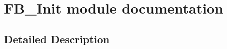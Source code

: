 \hypertarget{group___f_b___init__module}{}\section{F\+B\+\_\+\+Init module documentation}
\label{group___f_b___init__module}


\subsection{Detailed Description}
